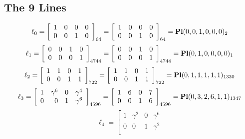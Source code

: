 \documentclass{article}
\begin{document}
{\subsection*{The 9 Lines}
$$
\ell_{0} = 
\left[
\begin{array}{*{4}{r}}
1 & 0 & 0 & 0\\
0 & 0 & 1 & 0\\
\end{array}
\right]
_{64}
=
\left[
\begin{array}{*{4}c}
1  & 0  & 0  & 0\\
0  & 0  & 1  & 0\\
\end{array}
\right]_{64}
={\rm\bf Pl}(0,0,1,0,0,0 )_{2}$$
$$
\ell_{1} = 
\left[
\begin{array}{*{4}{r}}
0 & 0 & 1 & 0\\
0 & 0 & 0 & 1\\
\end{array}
\right]
_{4744}
=
\left[
\begin{array}{*{4}c}
0  & 0  & 1  & 0\\
0  & 0  & 0  & 1\\
\end{array}
\right]_{4744}
={\rm\bf Pl}(0,1,0,0,0,0 )_{1}$$
$$
\ell_{2} = 
\left[
\begin{array}{*{4}{r}}
1 & 1 & 0 & 1\\
0 & 0 & 1 & 1\\
\end{array}
\right]
_{722}
=
\left[
\begin{array}{*{4}c}
1  & 1  & 0  & 1\\
0  & 0  & 1  & 1\\
\end{array}
\right]_{722}
={\rm\bf Pl}(0,1,1,1,1,1 )_{1330}$$
$$
\ell_{3} = 
\left[
\begin{array}{*{4}{r}}
1 & \gamma^{6} & 0 & \gamma^{4}\\
0 & 0 & 1 & \gamma^{6}\\
\end{array}
\right]
_{4596}
=
\left[
\begin{array}{*{4}c}
1  & 6  & 0  & 7\\
0  & 0  & 1  & 6\\
\end{array}
\right]_{4596}
={\rm\bf Pl}(0,3,2,6,1,1 )_{1347}$$
$$
\ell_{4} = 
\left[
\begin{array}{*{4}{r}}
1 & \gamma^{2} & 0 & \gamma^{6}\\
0 & 0 & 1 & \gamma^{2}\\

\end{array}$$}
\end{document}
